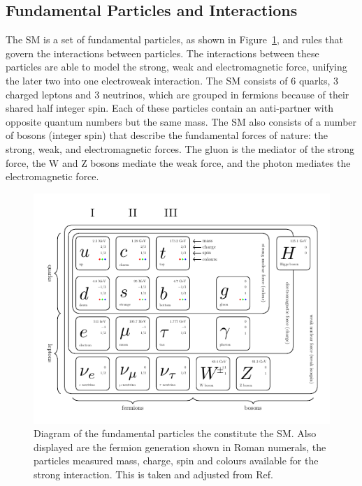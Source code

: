 \subsection{Fundamental Particles and Interactions}

The SM is a set of fundamental particles, as shown in Figure~\ref{fig:sm_diagram}, and rules that govern the interactions between particles.
The interactions between these particles are able to model the strong, weak and electromagnetic force, unifying the later two into one electroweak interaction.
The SM consists of 6 quarks, 3 charged leptons and 3 neutrinos, which are grouped in fermions because of their shared half integer spin. 
Each of these particles contain an anti-partner with opposite quantum numbers but the same mass.
The SM also consists of a number of bosons (integer spin) that describe the fundamental forces of nature: the strong, weak, and electromagnetic forces. 
The gluon is the mediator of the strong force, the W and Z bosons mediate the weak force, and the photon mediates the electromagnetic force. \\

\begin{figure}[!hbtp]
\centering
    \includegraphics[width=\textwidth]{Figures/SM_diagram.pdf}
\caption{Diagram of the fundamental particles the constitute the SM. Also displayed are the fermion generation shown in Roman numerals, the particles measured mass, charge, spin and colours available for the strong interaction. This is taken and adjusted from Ref.~\cite{}}
\label{fig:sm_diagram}
\end{figure}

